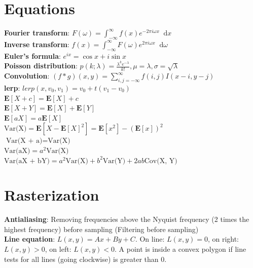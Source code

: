 \documentclass[9pt,landscape]{extarticle}
\newcommand{\expect}[1]{\mathbf{E}[#1]}
\newcommand{\var}[1]{\text{Var(#1)}}
\newcommand{\cov}[1]{\text{Cov(#1)}}
\newcommand*\diff{\mathop{}\!\mathrm{d}}
\begin{document}
\raggedright
\footnotesize
\begin{multicols}{3}

\setlength{\premulticols}{1pt}
\setlength{\postmulticols}{1pt}
\setlength{\multicolsep}{1pt}
\setlength{\columnsep}{2pt}


\section{Equations}

\textbf{Fourier transform}: $F(\omega) = \int_{-\infty}^{\infty} f(x) e^{-2\pi i \omega x} \diff x$ \\
\textbf{Inverse transform}: $f(x) = \int_{-\infty}^{\infty} F(\omega) e^{2\pi i \omega x} \diff\omega$ \\
\textbf{Euler's formula}: $e^{ix} = \cos x + i\sin x$ \\
\textbf{Poisson distribution}: $p(k; \lambda) = \frac{\lambda^k e^{-\lambda}}{k!}, \mu = \lambda, \sigma = \sqrt{\lambda}$ \\
\textbf{Convolution}: $(f * g)(x, y) = \sum_{i,j=-\infty}^{\infty}f(i, j)I(x-i, y-j)$ \\
\textbf{lerp}: $lerp(x, v_0, v_1) = v_0 + t(v_1 - v_0)$ \\
$\expect{X + c} = \expect{X} + c$ \\
$\expect{X + Y} = \expect{X} + \expect{Y}$ \\
$\expect{aX} = a\expect{X}$ \\
$\var{X} = \expect{X - \expect{X}^2} = \expect{x^2} - (\expect{x})^2$ \\
$\var{X + a} = \var{X}$ \\
$\var{aX} = a^2 \var{X}$ \\
$\var{aX + bY} = a^2 \var{X} + b^2 \var{Y} + 2ab \cov{X, Y}$ \\


\section{Rasterization}

\textbf{Antialiasing}: Removing frequencies above the Nyquist frequency (2 times the highest frequency) before sampling (Filtering before sampling) \\
\textbf{Line equation}: $L(x, y) = Ax + By + C$. On line: $L(x, y) = 0$, on right: $L(x, y) > 0$, on left: $L(x, y) < 0$. A point is inside a convex polygon if line tests for all lines (going clockwise) is greater than 0.


\end{multicols}
\end{document}
